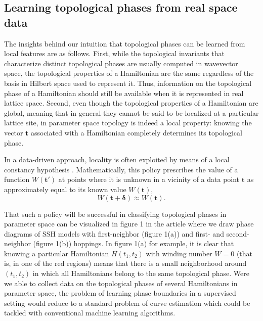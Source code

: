 \documentclass[10pt]{revtex4-1}
\begin{document}
\subsection*{Learning topological phases from real space data}


The insights behind our intuition that topological phases can be learned from local features are as follows. First, while the topological invariants that characterize distinct topological phases are usually computed in wavevector space, the topological properties of a Hamiltonian are the same regardless of the basis in Hilbert space used to represent it. Thus, information on the topological phase of a Hamiltonian should still be available when it is represented in real lattice space. Second, even though the topological properties of a Hamiltonian are global, meaning that in general they cannot be said to be localized at a particular lattice site, in parameter space topology is indeed a local property: knowing the vector $\mathbf{t}$ associated with a Hamiltonian completely determines its topological phase.

In a data-driven approach, locality is often exploited by means of a local constancy hypothesis \cite{goodfellow2016deep}. Mathematically, this policy prescribes the value of a function $W(\mathbf{t}')$ at points where it is unknown in a vicinity of a data point $\mathbf{t}$ as approximately equal to its known value $W(\mathbf{t})$,
\begin{equation}
\label{localconstancy}
W(\mathbf{t} + \boldsymbol{\delta}) \approx W(\mathbf{t}).
\end{equation}

That such a policy will be successful in classifying topological phases in parameter space can be visualized in figure 1 in the article %
where we draw phase diagrams of SSH models with first-neighbor (figure 1(a)) and first- and second-neighbor (figure 1(b)) hoppings. In figure 1(a) for example, it is clear that knowing a particular Hamiltonian $H(t_1,t_2)$ with winding number $W = 0$ (that is, in one of the red regions) means that there is a small neighborhood around $(t_1,t_2)$ in which all Hamiltonians  belong to the same topological phase. Were we able to collect data on the topological phases of several Hamiltonians in parameter space, the problem of learning phase boundaries in a supervised setting would reduce to a standard problem of curve estimation which could be tackled with conventional machine learning algorithms.
\end{document}

